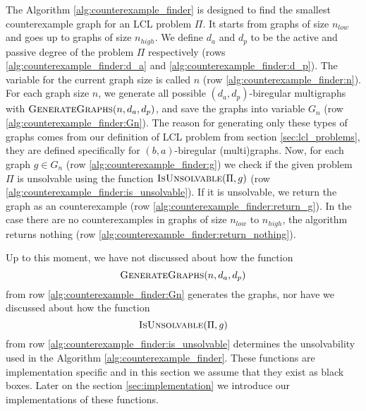 The Algorithm \ref{alg:counterexample_finder} is designed to find the smallest counterexample graph for an LCL problem $\Pi$.
It starts from graphs of size $n_{low}$ and goes up to graphs of size $n_{high}$.
We define $d_a$ and $d_p$ to be the active and passive degree of the problem $\Pi$ respectively (rows \ref{alg:counterexample_finder:d_a} and \ref{alg:counterexample_finder:d_p}).
The variable for the current graph size is called $n$ (row \ref{alg:counterexample_finder:n}).
For each graph size $n$, we generate all possible $(d_a, d_p)$-biregular multigraphs with $\textsc{GenerateGraphs}(n, d_a, d_p)$, and save the graphs into variable $G_n$ (row \ref{alg:counterexample_finder:Gn}).
The reason for generating only these types of graphs comes from our definition of LCL problem from section \ref{sec:lcl_problems}, they are defined specifically for $(b,a)$-biregular (multi)graphs.
Now, for each graph $g \in G_n$ (row \ref{alg:counterexample_finder:g}) we check if the given problem $\Pi$ is unsolvable using the function $\textsc{IsUnsolvable}(\Pi, g)$ (row \ref{alg:counterexample_finder:is_unsolvable}).
If it is unsolvable, we return the graph as an counterexample (row \ref{alg:counterexample_finder:return_g}).
In the case there are no counterexamples in graphs of size $n_{low}$ to $n_{high}$, the algorithm returns nothing (row \ref{alg:counterexample_finder:return_nothing}).

Up to this moment, we have not discussed about how the function $$\textsc{GenerateGraphs}(n, d_a, d_p)$$ from row \ref{alg:counterexample_finder:Gn} generates the graphs, nor have we discussed about how the function $$\textsc{IsUnsolvable}(\Pi, g)$$ from row \ref{alg:counterexample_finder:is_unsolvable} determines the unsolvability used in the Algorithm \ref{alg:counterexample_finder}.
These functions are implementation specific and in this section we assume that they exist as black boxes.
Later on the section \ref{sec:implementation} we introduce our implementations of these functions.



